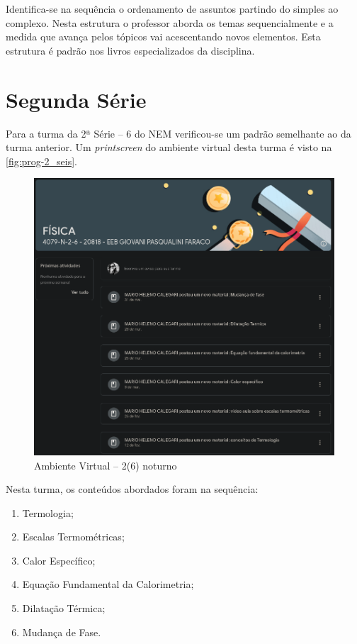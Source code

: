 Identifica-se na sequência o ordenamento de assuntos partindo do simples ao complexo. Nesta estrutura o professor aborda os temas sequencialmente e a medida que avança pelos tópicos vai acescentando novos elementos. Esta estrutura é padrão nos livros especializados da disciplina. 

\section{Segunda Série} %
\label{sec:Segunda Série}
Para a turma da 2ª Série -- 6 do \ac{NEM} verificou-se um padrão semelhante ao da turma anterior. Um \textit{printscreen} do ambiente virtual desta turma é visto na \autoref{fig:prog-2_seis}.
\vspace{10pt}
\begin{figure}[!ht]
	\centering
	\caption{Ambiente Virtual -- 2(6) noturno}
	\label{fig:prog-2_seis}
	\includegraphics[width=.8\linewidth]{assets/conteudo_programatico-2.png}
\end{figure}

\noindent Nesta turma, os conteúdos abordados foram na sequência:
\begin{enumerate}
	\item Termologia;
	\item Escalas Termométricas;
	\item Calor Específico;
	\item Equação Fundamental da Calorimetria;
	\item Dilatação Térmica;
	\item Mudança de Fase.
\end{enumerate}

